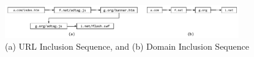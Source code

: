 \begin{figure}
    \centering
    \includegraphics[width=0.9\textwidth]{inclusion/figures/inclusion_sequence}
    \caption{(a) URL Inclusion Sequence, and (b) Domain Inclusion Sequence}
    \label{inclusion:fig:inclusion_sequence}
\end{figure}
